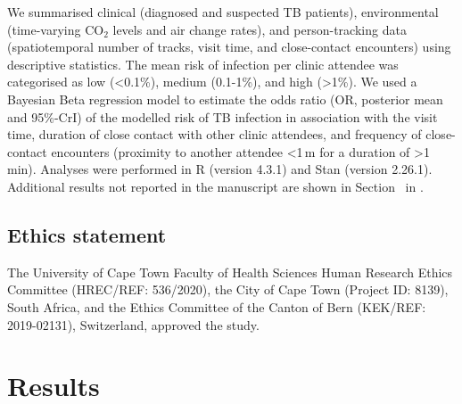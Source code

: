 \documentclass[fleqn,11pt]{wlscirep}
\begin{document}
We summarised clinical (diagnosed and suspected TB patients), environmental (time-varying CO$_2$ levels and air change rates), and person-tracking data (spatiotemporal number of tracks, visit time, and close-contact encounters) using descriptive statistics.   The mean risk of infection per clinic attendee was categorised as low (<0.1\%), medium (0.1-1\%), and high (>1\%). We used a Bayesian Beta regression model to estimate the odds ratio (OR, posterior mean and 95\%-CrI) of the modelled risk of TB infection in association with the visit time, duration of close contact with other clinic attendees, and frequency of close-contact encounters (proximity to another attendee <1\,m for a duration of >1\,min). Analyses were performed in R (version 4.3.1) and Stan (version 2.26.1). Additional results not reported in the manuscript are shown in Section~ in \supp. 

\subsection*{Ethics statement}

The University of Cape Town Faculty of Health Sciences Human Research Ethics Committee (HREC/REF: 536/2020), the City of Cape Town (Project ID: 8139), South Africa, and the Ethics Committee of the Canton of Bern (KEK/REF: 2019-02131), Switzerland, approved the study.

\newpage

\section*{Results}
\end{document}
